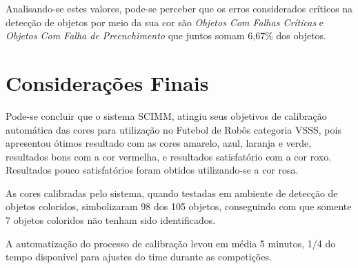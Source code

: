 	
	Analisando-se estes valores, pode-se perceber que os erros considerados críticos na detecção de objetos por meio da sua cor são \textit{Objetos Com Falhas Críticas} e \textit{Objetos Com Falha de Preenchimento} que juntos somam 6,67\% dos objetos.
	
	\section{Considerações Finais}
	
	Pode-se concluir que o sistema SCIMM, atingiu seus objetivos de calibração automática das cores para utilização no Futebol de Robôs categoria VSSS, pois apresentou ótimos resultado com as cores amarelo, azul, laranja e verde, resultados bons com a cor vermelha, e resultados satisfatório com a cor roxo. Resultados pouco satisfatórios foram obtidos utilizando-se a cor rosa. 
	
	As cores calibradas pelo sistema, quando testadas em ambiente de detecção de objetos coloridos, simbolizaram 98 dos 105 objetos, conseguindo com que somente 7 objetos coloridos não tenham sido identificados.
	
	A automatização do processo de calibração levou em média 5 minutos, 1/4 do tempo disponível para ajustes do time durante as competições.